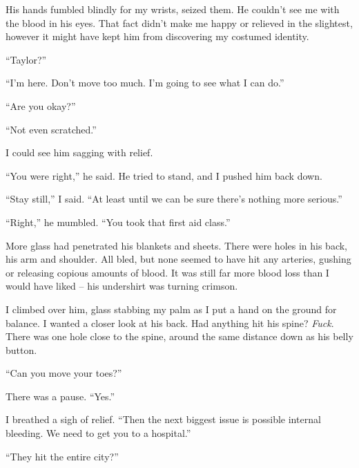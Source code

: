 His hands fumbled blindly for my wrists, seized them.  He couldn't see me with the blood in his eyes.  That fact didn't make me happy or relieved in the slightest, however it might have kept him from discovering my costumed identity.



``Taylor?''



``I'm here.  Don't move too much.  I'm going to see what I can do.''



``Are you okay?''



``Not even scratched.''



I could see him sagging with relief.



``You were right,'' he said.  He tried to stand, and I pushed him back down.



``Stay still,'' I said.  ``At least until we can be sure there's nothing more serious.''



``Right,'' he mumbled.  ``You took that first aid class.''



More glass had penetrated his blankets and sheets.  There were holes in his back, his arm and shoulder.  All bled, but none seemed to have hit any arteries, gushing or releasing copious amounts of blood.  It was still far more blood loss than I would have liked – his undershirt was turning crimson.



I climbed over him, glass stabbing my palm as I put a hand on the ground for balance.  I wanted a closer look at his back.  Had anything hit his spine?  \emph{Fuck}.  There was one hole close to the spine, around the same distance down as his belly button.



``Can you move your toes?''



There was a pause.  ``Yes.''



I breathed a sigh of relief.  ``Then the next biggest issue is possible internal bleeding.  We need to get you to a hospital.''



``They hit the entire city?''



